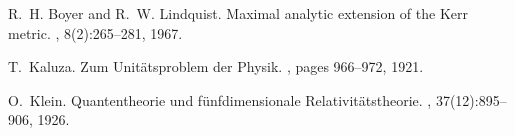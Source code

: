 \documentclass[11pt]{article}
\begin{document}
\begin{thebibliography}{10}
R.~H. Boyer and R.~W. Lindquist.
\newblock Maximal analytic extension of the Kerr metric.
, 8(2):265--281, 1967.

T.~Kaluza.
\newblock Zum Unitätsproblem der Physik.
, pages 966--972, 1921.

O.~Klein.
\newblock Quantentheorie und fünfdimensionale Relativitätstheorie.
, 37(12):895--906, 1926.

\end{thebibliography}
\end{document}

